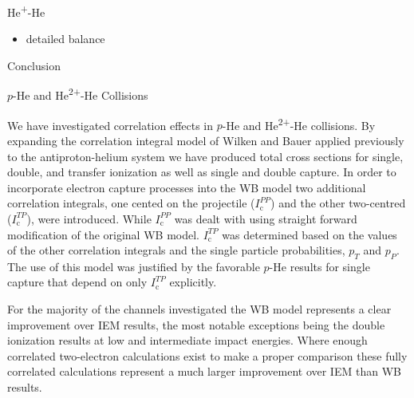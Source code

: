 \documentclass[letterpaper, 11 pt]{report}
\begin{document}
\begin{chapter}{\texorpdfstring{He\textsuperscript{+}}{He+}-He \label{chap:hep-he}}

   \begin{itemize}
      
      \item detailed balance \cite[p. 143--152]{scattering}

   \end{itemize}

\end{chapter}

\begin{chapter}{Conclusion \label{chap:con}}

   \begin{section}{\texorpdfstring{$p$}{p}-He and \texorpdfstring{He\textsuperscript{2+}}{He2+}-He
                   Collisions \label{sec:con-phe2p-he}}

      We have investigated correlation effects in $p$-He and He\textsuperscript{2+}-He collisions. By
      expanding the correlation integral model of Wilken and Bauer \cite{wb} applied previously to the
      antiproton-helium system \cite{pbarhe} we have produced total cross sections for single, double,
      and transfer ionization as well as single and double capture. In order to incorporate electron
      capture processes into the WB model two additional correlation integrals, one cented on the
      projectile ($I^{PP}_\mathrm{c}$) and the other two-centred ($I^{TP}_\mathrm{c}$), were
      introduced. While $I^{PP}_\mathrm{c}$ was dealt with using straight forward modification of the
      original WB model. $I^{TP}_\mathrm{c}$ was determined based on the values of the other correlation
      integrals and the single particle probabilities, $p_T$ and $p_P$. The use of this model was
      justified by the favorable $p$-He results for single capture that depend on only
      $I^{TP}_\mathrm{c}$ explicitly.

      For the majority of the channels investigated the WB model represents a clear improvement over IEM 
      results, the most notable exceptions being the double ionization results at low and intermediate
      impact energies. Where enough correlated two-electron calculations exist to make a proper
      comparison these fully correlated calculations represent a much larger improvement over IEM than
      WB results. 
  

\end{section}
\end{chapter}
\end{document}
